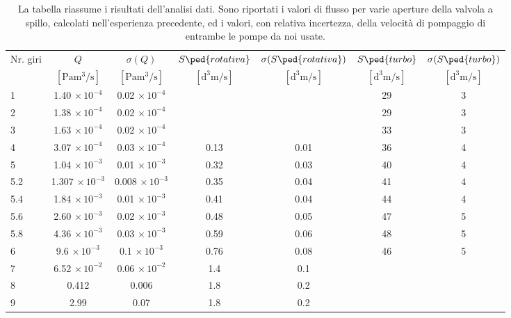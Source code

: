 \begin{table}
    \centering
    \begin{tabular}{l c c c c c c}
        \toprule
        Nr. giri & $Q$ & $\sigma (Q)$ & $S\ped{rotativa}$ & $\sigma (S\ped{rotativa})$ & $S\ped{turbo}$ & $\sigma (S\ped{turbo})$ \\

        & $[\si{\Pa\cubic\meter\per\second}]$ & $[\si{\Pa\cubic\meter\per\second}]$ &
        $[\si{\cubic\deci\meter\per\second}]$ & $[\si{\cubic\deci\meter\per\second}]$ &
        $[\si{\cubic\deci\meter\per\second}]$ & $[\si{\cubic\deci\meter\per\second}]$ \\

        \midrule
        1   & 1.40  $\times \, 10^{-4}$ & 0.02 $\times \, 10^{-4}$    &      &      & 29 & 3 \\
        2   & 1.38  $\times \, 10^{-4}$ & 0.02 $\times \, 10^{-4}$    &      &      & 29 & 3 \\
        3   & 1.63  $\times \, 10^{-4}$ & 0.02 $\times \, 10^{-4}$    &      &      & 33 & 3 \\
        4   & 3.07  $\times \, 10^{-4}$ & 0.03 $\times \, 10^{-4}$    & 0.13 & 0.01 & 36 & 4 \\
        5   & 1.04  $\times \, 10^{-3}$ & 0.01 $\times \, 10^{-3}$ & 0.32 & 0.03 & 40 & 4 \\
        5.2 & 1.307 $\times \, 10^{-3}$ & 0.008 $\times \, 10^{-3}$   & 0.35 & 0.04 & 41 & 4 \\
        5.4 & 1.84  $\times \, 10^{-3}$ & 0.01 $\times \, 10^{-3}$    & 0.41 & 0.04 & 44 & 4 \\
        5.6 & 2.60  $\times \, 10^{-3}$ & 0.02 $\times \, 10^{-3}$    & 0.48 & 0.05 & 47 & 5 \\
        5.8 & 4.36  $\times \, 10^{-3}$ & 0.03 $\times \, 10^{-3}$    & 0.59 & 0.06 & 48 & 5 \\
        6   & 9.6   $\times \, 10^{-3}$ & 0.1 $\times \, 10^{-3}$     & 0.76 & 0.08 & 46 & 5 \\
        7   & 6.52  $\times \, 10^{-2}$ & 0.06 $\times \, 10^{-2}$    & 1.4  & 0.1  &    &   \\
        8   & 0.412                     & 0.006                       & 1.8  & 0.2  &    &   \\
        9   & 2.99                      & 0.07                        & 1.8  & 0.2  &    &   \\
        \bottomrule
    \end{tabular}
    \label{tab:speed}
    \caption{La tabella riassume i risultati dell'analisi dati. Sono riportati i valori di flusso per varie aperture della
    valvola a spillo, calcolati nell'esperienza precedente, ed i valori, con relativa incertezza, della velocità di pompaggio di
    entrambe le pompe da noi usate.}
\end{table}
